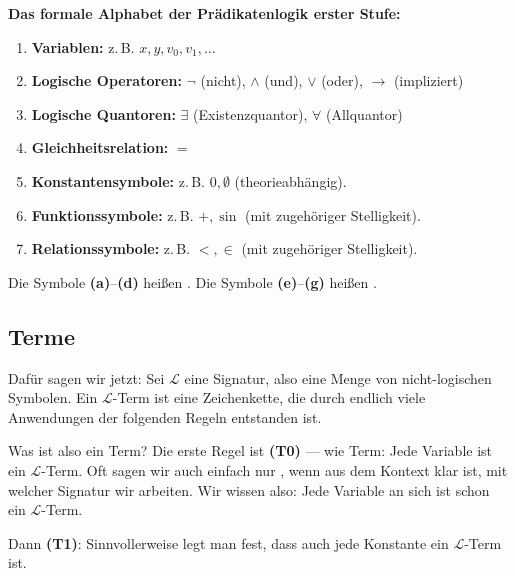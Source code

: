 \begin{math-stroke}
\textbf{Das formale Alphabet der Prädikatenlogik erster Stufe:}
\begin{enumerate}[label=\textbf{(\alph*)}]
    \item \textbf{Variablen:} z.\,B. $x, y, v_0, v_1, \dots$
    \item \textbf{Logische Operatoren:} $\neg$ (nicht), $\wedge$ (und), $\vee$ (oder), $\rightarrow$ (impliziert)
    \item \textbf{Logische Quantoren:} $\exists$ (Existenzquantor), $\forall$ (Allquantor)
    \item \textbf{Gleichheitsrelation:} $=$
    \item \textbf{Konstantensymbole:} z.\,B. $0, \emptyset$ (theorieabhängig).
    \item \textbf{Funktionssymbole:} z.\,B. $+, \sin$ (mit zugehöriger Stelligkeit).
    \item \textbf{Relationssymbole:} z.\,B. $<, \in$ (mit zugehöriger Stelligkeit).
\end{enumerate}

Die Symbole \textbf{(a)}--\textbf{(d)} heißen .
Die Symbole \textbf{(e)}--\textbf{(g)} heißen .

\end{math-stroke}

\subsection{Terme}

\begin{spoken-clean}[00:41:45 - 00:43:25]
Dafür sagen wir jetzt: Sei $\mathcal{L}$ eine Signatur, also eine Menge von nicht-logischen Symbolen. Ein $\mathcal{L}$-Term ist eine Zeichenkette, die durch endlich viele Anwendungen der folgenden Regeln entstanden ist. 

Was ist also ein Term? Die erste Regel ist \textbf{(T0)} ---  wie Term: Jede Variable ist ein $\mathcal{L}$-Term. Oft sagen wir auch einfach nur , wenn aus dem Kontext klar ist, mit welcher Signatur wir arbeiten. Wir wissen also: Jede Variable an sich ist schon ein $\mathcal{L}$-Term. 

Dann \textbf{(T1)}: Sinnvollerweise legt man fest, dass auch jede Konstante ein $\mathcal{L}$-Term ist.
\end{spoken-clean}

